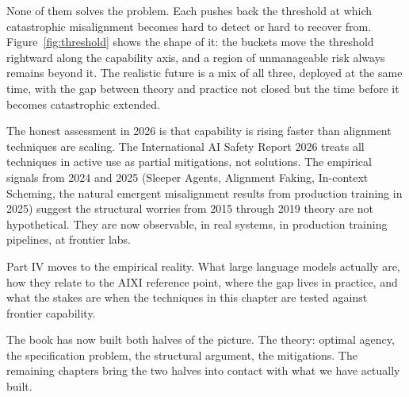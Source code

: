 None of them solves the problem. Each pushes back the threshold at which catastrophic misalignment becomes hard to detect or hard to recover from. Figure~\ref{fig:threshold} shows the shape of it: the buckets move the threshold rightward along the capability axis, and a region of unmanageable risk always remains beyond it. The realistic future is a mix of all three, deployed at the same time, with the gap between theory and practice not closed but the time before it becomes catastrophic extended.

The honest assessment in 2026 is that capability is rising faster than alignment techniques are scaling. The International AI Safety Report 2026 treats all techniques in active use as partial mitigations, not solutions. The empirical signals from 2024 and 2025 (Sleeper Agents, Alignment Faking, In-context Scheming, the natural emergent misalignment results from production training in 2025) suggest the structural worries from 2015 through 2019 theory are not hypothetical. They are now observable, in real systems, in production training pipelines, at frontier labs.

Part IV moves to the empirical reality. What large language models actually are, how they relate to the AIXI reference point, where the gap lives in practice, and what the stakes are when the techniques in this chapter are tested against frontier capability.

The book has now built both halves of the picture. The theory: optimal agency, the specification problem, the structural argument, the mitigations. The remaining chapters bring the two halves into contact with what we have actually built.
